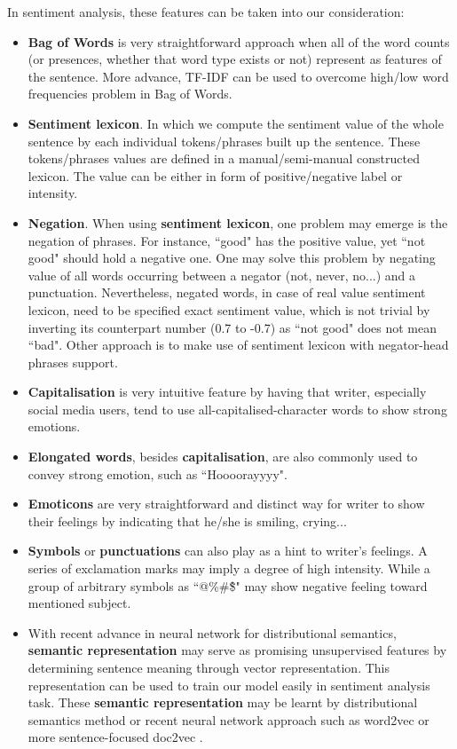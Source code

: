 \documentclass[12pt]{article}
\begin{document}
In sentiment analysis, these features can be taken into our consideration:
\begin{itemize}
	\item \textbf{Bag of Words} is very straightforward approach when all of the word counts (or presences, whether that word type exists or not) represent as features of the sentence. More advance, TF-IDF can be used to overcome high/low word frequencies problem in Bag of Words.

	\item \textbf{Sentiment lexicon}. In which we compute the sentiment value of the whole sentence by each individual tokens/phrases built up the sentence. These tokens/phrases values are defined in a manual/semi-manual constructed lexicon. The value can be either in form of positive/negative label or intensity.

	\item \textbf{Negation}. When using \textbf{sentiment lexicon}, one problem may emerge is the negation of phrases. For instance, ``good" has the positive value, yet ``not good" should hold a negative one. One may solve this problem by negating value of all words occurring between a negator (not, never, no...) and a punctuation. Nevertheless, negated words, in case of real value sentiment lexicon, need to be specified exact sentiment value, which is not trivial by inverting its counterpart number (0.7 to -0.7) as ``not good" does not mean ``bad". Other approach is to make use of sentiment lexicon with negator-head phrases support.
	
	\item \textbf{Capitalisation} is very intuitive feature by having that writer, especially social media users, tend to use all-capitalised-character words to show strong emotions.
	
	\item \textbf{Elongated words}, besides \textbf{capitalisation}, are also commonly used to convey strong emotion, such as ``Hoooorayyyy".
	
	\item \textbf{Emoticons} are very straightforward and distinct way for writer to show their feelings by indicating that he/she is smiling, crying...

	\item \textbf{Symbols} or \textbf{punctuations} can also play as a hint to writer's feelings. A series of exclamation marks may imply a degree of high intensity. While a group of arbitrary symbols as ``@\%\#\^\$" may show negative feeling toward mentioned subject.
	
	\item With recent advance in neural network for distributional semantics, \textbf{semantic representation} may serve as promising unsupervised features by determining sentence meaning through vector representation. This representation can be used to train our model easily in sentiment analysis task. These \textbf{semantic representation} may be learnt by distributional semantics method or recent neural network approach such as word2vec \cite{mikolov2013distributed} or more sentence-focused doc2vec \cite{le2014distributed}.
\end{itemize}
\end{document}
